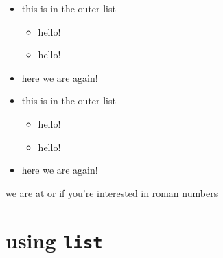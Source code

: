 \documentclass[12pt]{report}
\begin{document}
\begin{itemize}
\item this is in the outer list  
    \begin{itemize}
    \item hello!
    \item hello! 
    \end{itemize}
\item here we are again! 
\end{itemize}

\renewcommand{\labelitemi}{QwAcK}
\renewcommand{\labelitemii}{smallerQwack}
\renewcommand{\labelitemiii}{smallerQwack}
\renewcommand{\labelitemiv}{smallerQwack}

\renewcommand{\labelenumi}{QwAcK}
\renewcommand{\labelenumii}{smallerQwack}
\renewcommand{\labelenumiii}{smallerQwack}
\renewcommand{\labelenumiv}{smallerQwack}

\begin{itemize}
\item this is in the outer list  
    \begin{itemize}
    \item hello!
    \item hello! 
    \end{itemize}
\item here we are again! 
\end{itemize}

we are at \theenumi or  if you're interested in roman numbers

\section{using \texttt{list}}
\newcommand{\makeboxlabel}[1]{\fbox{#1.}}
\newenvironment{boxlabel}
  {\begin{list}
    {\arabic{boxlblcounter}} %
    {\usecounter{boxlblcounter} 
     \setlength{\labelwidth}{3em} %
     \setlength{\itemsep}{2pt} %
     \setlength{\leftmargin}{1.5cm} %
     \setlength{\rightmargin}{2cm}
     \let\makelabel=\makeboxlabel %
    }
  }
{\end{list}}
\end{document}
